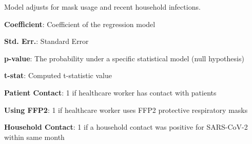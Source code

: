 \documentclass[11pt]{article}
\begin{document}
\begin{table}[h]
\caption{\protect\hyperlink{file-table-2-pkl}{Association Between Patient Contact and Number of Symptoms}}
\label{table:patient_symptoms}
\begin{threeparttable}
\renewcommand{\TPTminimum}{\linewidth}
\begin{tablenotes}
\footnotesize
\item Model adjusts for mask usage and recent household infections.
\item \textbf{Coefficient}: Coefficient of the regression model
\item \textbf{Std. Err.}: Standard Error
\item \textbf{p-value}: The probability under a specific statistical model (null hypothesis)
\item \textbf{t-stat}: Computed t-statistic value
\item \textbf{Patient Contact}: 1 if healthcare worker has contact with patients
\item \textbf{Using FFP2}: 1 if healthcare worker uses FFP2 protective respiratory masks
\item \textbf{Household Contact}: 1 if a household contact was positive for SARS-CoV-2 within same month
\end{tablenotes}
\end{threeparttable}
\end{table}
\end{document}
